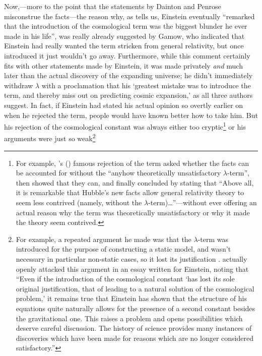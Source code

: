 \documentclass[12 pt]{article}
\def\citeapos#1{\citeauthor{#1}'s (\citeyear{#1})}
\begin{document}
Now,---more to the point that the statements by Dainton and Penrose misconstrue the facts---the reason why, as \citet{Gamow1970} tells us, Einstein eventually  ``remarked that the introduction of the cosmological term was the biggest blunder he ever made in his life'', was really already suggested by Gamow, who indicated that Einstein had really wanted the term stricken from general relativity, but once introduced it just wouldn't go away. Furthermore, while this comment certainly fits with other statements made by Einstein, it was made privately \textit{and} much later than the actual discovery of the expanding universe; he didn't immediately withdraw $\lambda$ with a proclamation that his `greatest mistake was to introduce the term, and thereby miss out on predicting cosmic expansion,' as all three authors suggest. In fact, if Einstein had stated his actual opinion so overtly earlier on when he rejected the term, people would have known better how to take him. But his rejection of the cosmological constant was always either too cryptic\footnote{For example, \citeapos{Einstein1931a} famous rejection of the term asked whether the facts can be accounted for without the ``anyhow theoretically unsatisfactory $\lambda$-term'', then showed that they can, and finally concluded by stating that ``Above all, it is remarkable that Hubble's new facts allow general relativity theory to seem less contrived (namely, without the $\lambda$-term)\ldots''---without ever offering an actual reason why the term was theoretically unsatisfactory or why it made the theory seem contrived. 

} or his arguments were just so weak\footnote{For example, a repeated argument he made was that the $\lambda$-term was introduced for the purpose of constructing a static model, and wasn't necessary in particular non-static cases, so it lost its justification \citep{Einstein1932,Einstein1945}. \citet{Lemaitre1949a} actually openly attacked this argument in an essay written for Einstein, noting that ``Even if the introduction of the cosmological constant `has lost its sole original justification, that of leading to a natural solution of the cosmological problem,' it remains true that Einstein has shown that the structure of his equations quite naturally allows for the presence of a second constant besides the gravitational one. This raises a problem and opens possibilities which deserve careful discussion. The history of science provides many instances of discoveries which have been made for reasons which are no longer considered satisfactory.'' 

}
\end{document}
